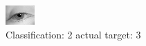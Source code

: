 \begin{figure}[h!]
\begin{center}
\includegraphics[width=0.60\columnwidth]{figures/ID2872_class_2_target_3.png}
\end{center}
\caption{ Classification: 2 actual target: 3}
\label{fig:ID2872_class_2_target_3}
\end{figure}
